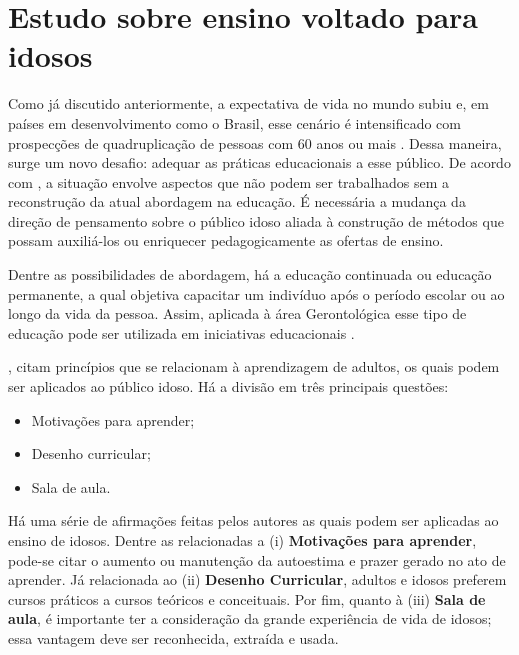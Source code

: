 \section{Estudo sobre ensino voltado para idosos}

Como já discutido anteriormente, a expectativa de vida no mundo subiu e, em países em desenvolvimento como o Brasil, esse cenário é intensificado com prospecções de quadruplicação de pessoas com 60 anos ou mais \citep{demografico2010disponivel}. Dessa maneira, surge um novo desafio: adequar as práticas educacionais a esse público. De acordo com \cite{rethinkingTeacherEducation}, a situação envolve aspectos que não podem ser trabalhados sem a reconstrução da atual abordagem na educação. É necessária a mudança da direção de pensamento sobre o público idoso aliada à construção de métodos que possam auxiliá-los ou enriquecer pedagogicamente as ofertas de ensino.

Dentre as possibilidades de abordagem, há a educação continuada ou educação permanente, a qual objetiva capacitar um indivíduo após o período escolar ou ao longo da vida da pessoa. Assim, aplicada à área Gerontológica esse tipo de educação pode ser utilizada em iniciativas educacionais \citep{neri2001palavras}. 

\cite{zemke198430}, citam princípios que se relacionam à aprendizagem de adultos, os quais podem ser aplicados ao público idoso. Há a divisão em três principais questões: 
\begin{itemize}
    \item Motivações para aprender;
    \item Desenho curricular;
    \item Sala de aula.
\end{itemize}

Há uma série de afirmações feitas pelos autores as quais podem ser aplicadas ao ensino de idosos. Dentre as relacionadas a (i) \textbf{Motivações para aprender}, pode-se citar o aumento ou manutenção da autoestima e prazer gerado no ato de aprender. Já relacionada ao (ii) \textbf{Desenho Curricular}, adultos e idosos preferem cursos práticos a cursos teóricos e conceituais. Por fim, quanto à (iii) \textbf{Sala de aula}, é importante ter a consideração da grande experiência de vida de idosos; essa vantagem deve ser reconhecida, extraída e usada.


